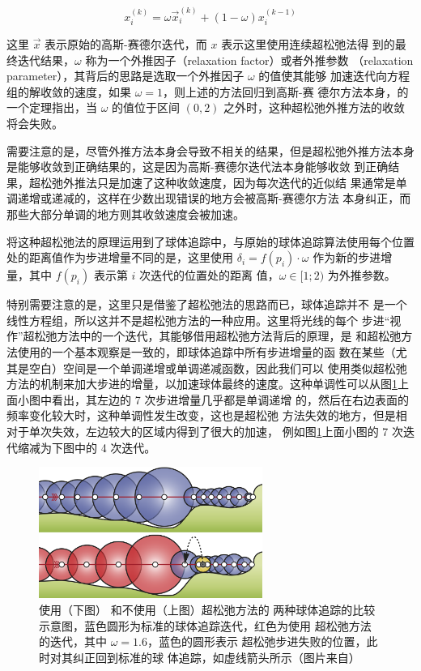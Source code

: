 \begin{equation}
	x^{(k)}_i=\omega\vec{x}^{(k)}_i+(1-\omega)x^{(k-1)}_i
\end{equation}

这里 $\vec{x}$ 表示原始的高斯-赛德尔迭代，而 $x$ 表示这里使用连续超松弛法得 到的最终迭代结果，$\omega$ 称为一个外推因子（relaxation factor）或者外推参数 （relaxation parameter），其背后的思路是选取一个外推因子 $\omega$ 的值使其能够 加速迭代向方程组的解收敛的速度，如果 $\omega = 1$，则上述的方法回归到高斯-赛 德尔方法本身，\cite{a:Gauss-seidelmethodsofsolvinglargesystemsoflinearequations}的一个定理指出，当 $\omega$ 的值位于区间 $(0, 2)$ 之外时，这种超松弛外推方法的收敛将会失败。 

需要注意的是，尽管外推方法本身会导致不相关的结果，但是超松弛外推方法本身是能够收敛到正确结果的，这是因为高斯-赛德尔迭代法本身能够收敛 到正确结果，超松弛外推法只是加速了这种收敛速度，因为每次迭代的近似结 果通常是单调递增或递减的，这样在少数出现错误的地方会被高斯-赛德尔方法 本身纠正，而那些大部分单调的地方则其收敛速度会被加速。

\cite{a:Enhanced-Sphere-Tracing}将这种超松弛法的原理运用到了球体追踪中，与原始的球体追踪算法使用每个位置处的距离值作为步进增量不同的是，这里使用 $\delta_i = f(p_i) \cdot \omega$ 作为新的步进增量，其中 $f(p_i)$ 表示第 $i$ 次迭代的位置处的距离 值，$\omega \in [1; 2)$ 为外推参数。

特别需要注意的是，这里只是借鉴了超松弛法的思路而已，球体追踪并不 是一个线性方程组，所以这并不是超松弛方法的一种应用。这里将光线的每个 步进“视作”超松弛方法中的一个迭代，其能够借用超松弛方法背后的原理，是 和超松弛方法使用的一个基本观察是一致的，即球体追踪中所有步进增量的函 数在某些（尤其是空白）空间是一个单调递增或单调递减函数，因此我们可以 使用类似超松弛方法的机制来加大步进的增量，以加速球体最终的速度。这种单调性可以从图\ref{f:df-over-relaxation}上面小图中看出，其左边的 7 次步进增量几乎都是单调递增 的，然后在右边表面的频率变化较大时，这种单调性发生改变，这也是超松弛 方法失效的地方，但是相对于单次失效，左边较大的区域内得到了很大的加速， 例如图\ref{f:df-over-relaxation}上面小图的 7 次迭代缩减为下图中的 4 次迭代。

\begin{figure}
\sidecaption
	\includegraphics[width=0.65\textwidth]{figures/df/over-relaxation}
	\caption{使用（下图） 和不使用（上图）超松弛方法的 两种球体追踪的比较示意图，蓝色圆形为标准的球体追踪迭代，红色为使用 超松弛方法的迭代，其中 $\omega = 1.6$，蓝色的圆形表示 超松弛步进失败的位置，此时对其纠正回到标准的球 体追踪，如虚线箭头所示（图片来自\cite{a:Enhanced-Sphere-Tracing}）}
	\label{f:df-over-relaxation}
\end{figure}

